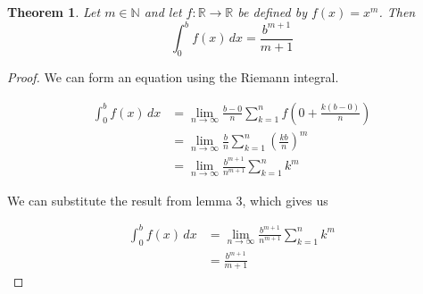 \documentclass{article}
\newtheorem{theorem}{Theorem}
\begin{document}
\begin{theorem}
Let $m \in \mathbb{N}$ and let $f: \mathbb{R} \to \mathbb{R}$ be defined by $f(x) = x^{m}$. Then
\begin{equation*}
\int_{0}^{b} f(x) \,dx  = \frac{b^{m+1}}{m+1}
\end{equation*}
\end{theorem}

\begin{proof}
We can form an equation using the Riemann integral.

\begin{align*}
\int_{0}^{b} f(x) \,dx &= \lim_{n \to \infty} \frac{b - 0}{n} \sum_{k=1}^{n} f(0 + \frac{k(b-0)}{n}) \\
&= \lim_{n \to \infty} \frac{b}{n} \sum_{k=1}^{n} \left( \frac{kb}{n} \right) ^{m} \\
&= \lim_{n \to \infty} \frac{b^{m+1}}{n^{m+1}} \sum_{k=1}^{n} k^{m}
\end{align*}

We can substitute the result from lemma 3, which gives us

\begin{align*}
\int_{0}^{b} f(x) \,dx &= \lim_{n \to \infty} \frac{b^{m+1}}{n^{m+1}} \sum_{k=1}^{n} k^{m} \\
&= \frac{b^{m+1}}{m+1}
\end{align*}

\end{proof}
\end{document}
